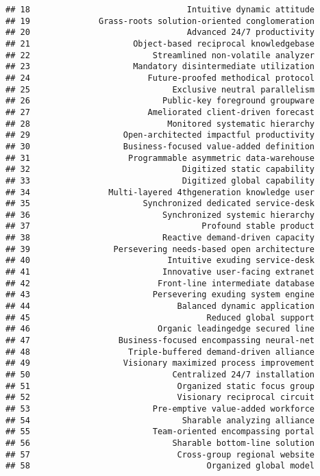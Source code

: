 \documentclass[
]{article}
\begin{document}
\begin{verbatim}
## 18                                Intuitive dynamic attitude
## 19              Grass-roots solution-oriented conglomeration
## 20                                Advanced 24/7 productivity
## 21                     Object-based reciprocal knowledgebase
## 22                         Streamlined non-volatile analyzer
## 23                     Mandatory disintermediate utilization
## 24                        Future-proofed methodical protocol
## 25                             Exclusive neutral parallelism
## 26                           Public-key foreground groupware
## 27                        Ameliorated client-driven forecast
## 28                            Monitored systematic hierarchy
## 29                   Open-architected impactful productivity
## 30                   Business-focused value-added definition
## 31                    Programmable asymmetric data-warehouse
## 32                               Digitized static capability
## 33                               Digitized global capability
## 34                Multi-layered 4thgeneration knowledge user
## 35                       Synchronized dedicated service-desk
## 36                           Synchronized systemic hierarchy
## 37                                   Profound stable product
## 38                           Reactive demand-driven capacity
## 39                 Persevering needs-based open architecture
## 40                            Intuitive exuding service-desk
## 41                           Innovative user-facing extranet
## 42                          Front-line intermediate database
## 43                         Persevering exuding system engine
## 44                              Balanced dynamic application
## 45                                    Reduced global support
## 46                          Organic leadingedge secured line
## 47                  Business-focused encompassing neural-net
## 48                    Triple-buffered demand-driven alliance
## 49                   Visionary maximized process improvement
## 50                             Centralized 24/7 installation
## 51                              Organized static focus group
## 52                              Visionary reciprocal circuit
## 53                         Pre-emptive value-added workforce
## 54                               Sharable analyzing alliance
## 55                         Team-oriented encompassing portal
## 56                             Sharable bottom-line solution
## 57                              Cross-group regional website
## 58                                    Organized global model

\end{verbatim}
\end{document}
